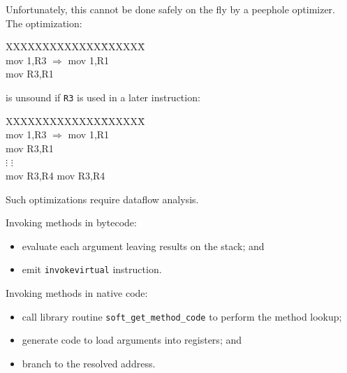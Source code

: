 \begin{slide*}
Unfortunately, this cannot be done safely on the fly by a peephole optimizer.\\

The optimization:
\newcommand{\LONG}{\mbox{$\Longrightarrow$}}
\begin{tt}
\begin{tabbing}
XXXXXXXXXXXXX\=XXXXXX\=\kill
\\
mov 1,R3  \>   $\Longrightarrow$ \>   mov 1,R1 \\
mov R3,R1 \\

\end{tabbing}
\end{tt}
is unsound if {\tt R3} is used in a later instruction:
\begin{tt}
\begin{tabbing}
XXXXXXXXXXXXX\=XXXXXX\=\kill
\\
mov 1,R3  \> $\Longrightarrow$ \>  mov 1,R1 \\
mov R3,R1 \\
$\vdots$   \>\>               $\vdots$\\
mov R3,R4   \>\>        mov R3,R4\\
 
\end{tabbing}
\end{tt}
Such optimizations require dataflow analysis.
\vfil
\end{slide*}
 
\begin{slide*}
Invoking methods in bytecode:
\begin{itemize}
\item evaluate each argument leaving results on the stack; and
\item emit {\tt invokevirtual} instruction.
\end{itemize}
\vspace*{2em}

Invoking methods in native code:
\begin{itemize}
\item call library routine {\tt soft\_get\_method\_code} to perform the method lookup;
\item generate code to load arguments into registers; and
\item branch to the resolved address.
\end{itemize}
\vfil
\end{slide*}

